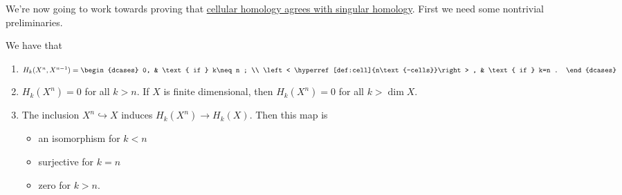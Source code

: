 We're now going to work towards proving that \hyperref[thm:cellular-homology-agrees-with-singular-homology]{cellular homology agrees with singular homology}.
First we need some nontrivial preliminaries.
\begin{lemma}\label{lma:lec-34}
	We have that
	\begin{enumerate}
		\item \(H_k(X^n, X^{n - 1}) = \begin{dcases}
			      0,                                                  & \text{ if } k\neq n ; \\
			      \left< \hyperref[def:cell]{n\text{-cells}}\right> , & \text{ if } k=n .
		      \end{dcases}\)
		\item \(H_k(X^n) = 0\) for all \(k > n\). If \(X\) is finite dimensional, then \(H_k(X^n) = 0\) for all \(k > \dim X\).
		\item The inclusion \(X^n \hookrightarrow X\) induces \(H_k(X^n) \to H_k(X)\). Then this map is
		      \begin{itemize}
			      \item an isomorphism for \(k < n\)
			      \item surjective for \(k = n\)
			      \item zero for \(k > n\).
		      \end{itemize}
	\end{enumerate}
\end{lemma}
